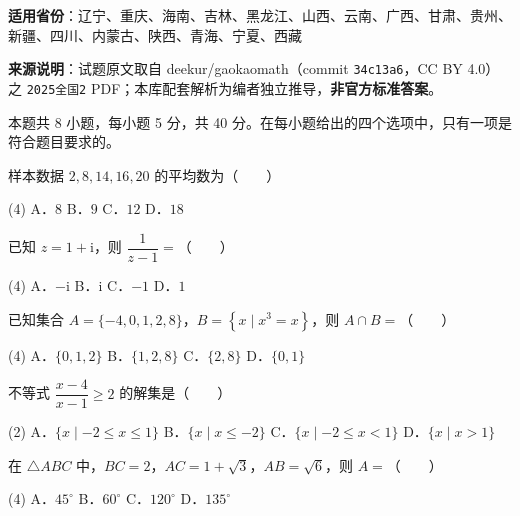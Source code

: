 

\begin{gknotice}
\textbf{适用省份}：辽宁、重庆、海南、吉林、黑龙江、山西、云南、广西、甘肃、贵州、新疆、四川、内蒙古、陕西、青海、宁夏、西藏

\textbf{来源说明}：试题原文取自 deekur/gaokaomath（commit \texttt{34c13a6}，CC BY 4.0）之 \texttt{2025全国2} PDF；本库配套解析为编者独立推导，\textbf{非官方标准答案}。
\end{gknotice}

\par\medskip


\begin{gktip}
本题共 8 小题，每小题 5 分，共 40 分。在每小题给出的四个选项中，只有一项是符合题目要求的。
\end{gktip}

样本数据 $2,8,14,16,20$ 的平均数为（　　）

\begin{gkopts}(4)
\task A．$8$
\task B．$9$
\task C．$12$
\task D．$18$
\end{gkopts}

已知 $z=1+\mathrm{i}$，则 $\dfrac{1}{z-1}=$（　　）

\begin{gkopts}(4)
\task A．$-\mathrm{i}$
\task B．$\mathrm{i}$
\task C．$-1$
\task D．$1$
\end{gkopts}

已知集合 $A=\{-4,0,1,2,8\}$，$B=\left\{x\mid x^3=x\right\}$，则 $A\cap B=$（　　）

\begin{gkopts}(4)
\task A．$\{0,1,2\}$
\task B．$\{1,2,8\}$
\task C．$\{2,8\}$
\task D．$\{0,1\}$
\end{gkopts}

不等式 $\dfrac{x-4}{x-1}\ge 2$ 的解集是（　　）

\begin{gkopts}(2)
\task A．$\{x\mid -2\le x\le 1\}$
\task B．$\{x\mid x\le -2\}$
\task C．$\{x\mid -2\le x<1\}$
\task D．$\{x\mid x>1\}$
\end{gkopts}

在 $\triangle ABC$ 中，$BC=2$，$AC=1+\sqrt3$，$AB=\sqrt6$，则 $A=$（　　）

\begin{gkopts}(4)
\task A．$45^\circ$
\task B．$60^\circ$
\task C．$120^\circ$
\task D．$135^\circ$
\end{gkopts}

